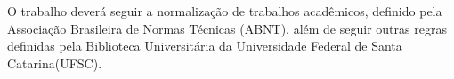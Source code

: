 O trabalho deverá seguir a normalização de trabalhos acadêmicos, definido pela Associação Brasileira de Normas Técnicas (ABNT), além de seguir outras regras definidas pela Biblioteca Universitária da Universidade Federal de Santa Catarina(UFSC).